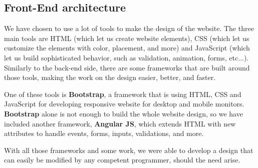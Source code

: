 \subsection{Front-End architecture}

We have chosen to use a lot of tools to make the design of the website. The three main tools are HTML
(which let us create website elements), CSS (which let us customize the elements with color, placement,
and more) and JavaScript (which let us build sophisticated behavior, such as validation, animation, forms, etc...). Similarly to the back-end side, there are some frameworks that are built around those tools, making the work on the design
easier, better, and faster. \newline

One of these tools is \textbf{Bootstrap}, a framework that is using HTML, CSS and JavaScript for
developing responsive website for desktop and mobile monitors. \textbf{Bootstrap} alone is not enough
to build the whole website design, so we have included another framework, \textbf{Angular
JS}, which extends HTML with new attributes to handle events, forms, inputs, validations, and
more.\newline

With all those frameworks and some work, we were able to develop a design that can
easily be modified by any competent programmer, should the need arise.
